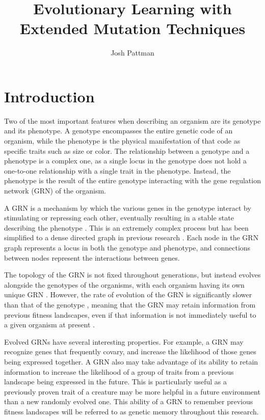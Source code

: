 \documentclass[twocolumn,a4paper,11pt]{article}
\author{Josh Pattman}
\title{Evolutionary Learning with Extended Mutation Techniques}
\begin{document}
	\maketitle
    \section{Introduction}
    Two of the most important features when describing an organism are its genotype and its phenotype. A genotype encompasses the entire genetic code of an organism, while the phenotype is the physical manifestation of that code as specific traits such as size or color. The relationship between a genotype and a phenotype is a complex one, as a single locus in the genotype does not hold a one-to-one relationship with a single trait in the phenotype. Instead, the phenotype is the result of the entire genotype interacting with the gene regulation network (GRN) of the organism.

    A GRN is a mechanism by which the various genes in the genotype interact by stimulating or repressing each other, eventually resulting in a stable state describing the phenotype \cite{what-is-grn}. This is an extremely complex process but has been simplified to a dense directed graph in previous research \cite{grn-1}. Each node in the GRN graph represents a locus in both the genotype and phenotype, and connections between nodes represent the interactions between genes.
    
    The topology of the GRN is not fixed throughout generations, but instead evolves alongside the genotypes of the organisms, with each organism having its own unique GRN \cite{evolving-grns}. However, the rate of evolution of the GRN is significantly slower than that of the genotype \cite{evo-speed-grn}, meaning that the GRN may retain information from previous fitness landscapes, even if that information is not immediately useful to a given organism at present \cite{grn-learn-from-past}.

    Evolved GRNs have several interesting properties. For example, a GRN may recognize genes that frequently covary, and increase the likelihood of those genes being expressed together. A GRN also may take advantage of its ability to retain information to increase the likelihood of a group of traits from a previous landscape being expressed in the future. This is particularly useful as a previously proven trait of a creature may be more helpful in a future environment than a new randomly evolved one. This ability of a GRN to remember previous fitness landscapes will be referred to as genetic memory throughout this research.
\end{document}
